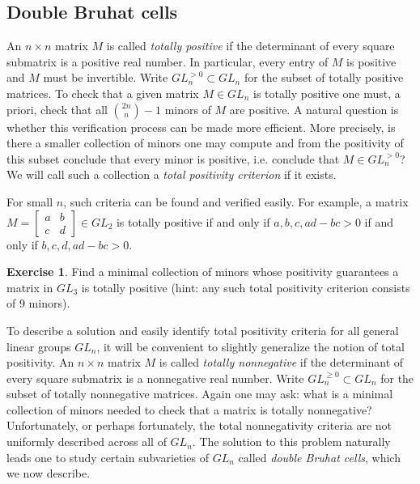 \documentclass{amsart}
\theoremstyle{definition}
\newtheorem{example}[theorem]{Example}
\newtheorem{exercise}[theorem]{Exercise}
\theoremstyle{remark}
\numberwithin{equation}{section}
\begin{document}
	\subsection{Double Bruhat cells} \label{sub:total positivity}
    An $n\times n$ matrix $M$ is called \emph{totally positive} if the determinant of every square submatrix is a positive real number.  In particular, every entry of $M$ is positive and $M$ must be invertible.  Write $GL_n^{>0}\subset GL_n$ for the subset of totally positive matrices.  To check that a given matrix $M\in GL_n$ is totally positive one must, a priori, check that all ${2n\choose n}-1$ minors of $M$ are positive.  A natural question is whether this verification process can be made more efficient.  More precisely, is there a smaller collection of minors one may compute and from the positivity of this subset conclude that every minor is positive, i.e. conclude that $M\in GL_n^{>0}$?  We will call such a collection a \emph{total positivity criterion} if it exists.  

    For small $n$, such criteria can be found and verified easily.  For example, a matrix $M=\left[\begin{array}{cc} a & b\\ c & d\end{array}\right]\in GL_2$ is totally positive if and only if $a,b,c,ad-bc>0$ if and only if $b,c,d,ad-bc>0$.
    \begin{exercise}\label{exer:gl3 positivity}
      Find a minimal collection of minors whose positivity guarantees a matrix in $GL_3$ is totally positive (hint: any such total positivity criterion consists of 9 minors).
    \end{exercise}

    To describe a solution and easily identify total positivity criteria for all general linear groups $GL_n$, it will be convenient to slightly generalize the notion of total positivity.  An $n\times n$ matrix $M$ is called \emph{totally nonnegative} if the determinant of every square submatrix is a nonnegative real number.  Write $GL_n^{\ge0}\subset GL_n$ for the subset of totally nonnegative matrices.  Again one may ask: what is a minimal collection of minors needed to check that a matrix is totally nonnegative?  Unfortunately, or perhaps fortunately, the total nonnegativity criteria are not uniformly described across all of $GL_n$.  The solution to this problem naturally leads one to study certain subvarieties of $GL_n$ called \emph{double Bruhat cells}, which we now describe.
\end{document}
